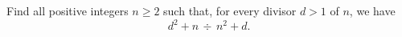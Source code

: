 Find all positive integers $n \geq 2$ such that, for every divisor $d> 1$ of $n$, we have
$$d^2+n \, \div \, n^2+d.$$
